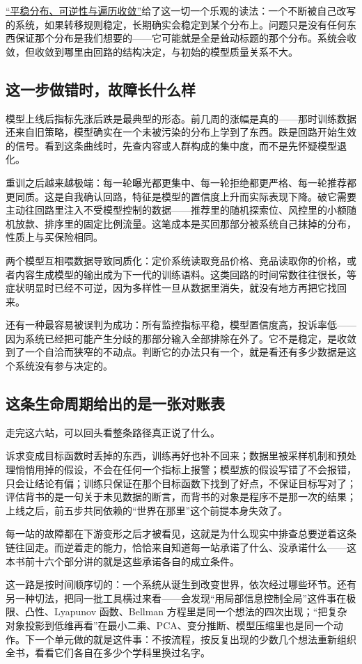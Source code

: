 \hyperref[sec:06-Random-Processes/03-Markov-Chains/04]{``平稳分布、可逆性与遍历收敛''}给了这一切一个乐观的读法：一个不断被自己改写的系统，如果转移规则稳定，长期确实会稳定到某个分布上。问题只是没有任何东西保证那个分布是我们想要的——它可能就是全是耸动标题的那个分布。系统会收敛，但收敛到哪里由回路的结构决定，与初始的模型质量关系不大。

\subsection{这一步做错时，故障长什么样}

模型上线后指标先涨后跌是最典型的形态。前几周的涨幅是真的——那时训练数据还来自旧策略，模型确实在一个未被污染的分布上学到了东西。跌是回路开始生效的信号。看到这条曲线时，先查内容或人群构成的集中度，而不是先怀疑模型退化。

重训之后越来越极端：每一轮曝光都更集中、每一轮拒绝都更严格、每一轮推荐都更同质。这是自我确认回路，特征是模型的置信度上升而实际表现下降。破它需要主动往回路里注入不受模型控制的数据——推荐里的随机探索位、风控里的小额随机放款、排序里的固定比例流量。这笔成本是买回那部分被系统自己抹掉的分布，性质上与买保险相同。

两个模型互相喂数据导致同质化：定价系统读取竞品价格、竞品读取你的价格，或者内容生成模型的输出成为下一代的训练语料。这类回路的时间常数往往很长，等症状明显时已经不可逆，因为多样性一旦从数据里消失，就没有地方再把它找回来。

还有一种最容易被误判为成功：所有监控指标平稳，模型置信度高，投诉率低——因为系统已经把可能产生分歧的那部分输入全部排除在外了。它不是稳定，是收敛到了一个自洽而狭窄的不动点。判断它的办法只有一个，就是看还有多少数据是这个系统没有参与决定的。

\subsection{这条生命周期给出的是一张对账表}

走完这六站，可以回头看整条路径真正说了什么。

诉求变成目标函数时丢掉的东西，训练再好也补不回来；数据里被采样机制和预处理悄悄用掉的假设，不会在任何一个指标上报警；模型族的假设写错了不会报错，只会让结论有偏；训练只保证在那个目标函数下找到了好点，不保证目标写对了；评估背书的是一句关于未见数据的断言，而背书的对象是程序不是那一次的结果；上线之后，前五步共同依赖的``世界在那里''这个前提本身失效了。

每一站的故障都在下游变形之后才被看见，这就是为什么现实中排查总要逆着这条链往回走。而逆着走的能力，恰恰来自知道每一站承诺了什么、没承诺什么——这本书前十六个部分讲的就是这些承诺各自的成立条件。

这一路是按时间顺序切的：一个系统从诞生到改变世界，依次经过哪些环节。还有另一种切法，把同一批工具横过来看——会发现``用局部信息控制全局''这件事在极限、凸性、Lyapunov 函数、Bellman 方程里是同一个想法的四次出现；``把复杂对象投影到低维再看''在最小二乘、PCA、变分推断、模型压缩里也是同一个动作。下一个单元做的就是这件事：不按流程，按反复出现的少数几个想法重新组织全书，看看它们各自在多少个学科里换过名字。
